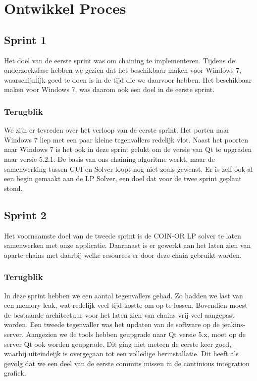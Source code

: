 \section{Ontwikkel Proces}

\subsection{Sprint 1}
Het doel van de eerste sprint was om chaining te implementeren. Tijdens de onderzoeksfase hebben we gezien dat het beschikbaar maken voor Windows 7, waarschijnlijk goed te doen is in de tijd die we daarvoor hebben. Het beschikbaar maken voor Windows 7, was daarom ook een doel in de eerste sprint. 

\subsubsection*{Terugblik}
We zijn er tevreden over het verloop van de eerste sprint. Het porten naar Windows 7 liep met een paar kleine tegenvallers redelijk vlot. Naast het poorten naar Windows 7 is het ook in deze sprint gelukt om de versie van Qt te upgraden naar versie 5.2.1. De basis van ons chaining algoritme werkt, maar de samenwerking tussen GUI en Solver loopt nog niet zoals gewenst. Er is zelf ook al een begin gemaakt aan de LP Solver, een doel dat voor de twee sprint geplant stond. 

\subsection{Sprint 2}
Het voornaamste doel van de tweede sprint is de COIN-OR LP solver te laten samenwerken met onze applicatie. Daarnaast is er gewerkt aan het laten zien van aparte chains met daarbij welke resources er door deze chain gebruikt worden. 

\subsubsection*{Terugblik}
In deze sprint hebben we een aantal tegenvallers gehad. Zo hadden we last van een memory leak, wat redelijk veel tijd kostte om op te lossen. Bovendien moest de bestaande architectuur voor het laten zien van chains vrij veel aangepast worden. Een tweede tegenvaller was het updaten van de software op de jenkins-server. Aangezien we de tools hebben geupgrade naar Qt versie 5.x, moet op de server Qt ook worden geupgrade. Dit ging niet meteen de eerste keer goed, waarbij uiteindeijk is overgegaan tot een volledige herinstallatie. Dit heeft als gevolg dat we een deel van de eerste commits missen in de continious integration grafiek.

